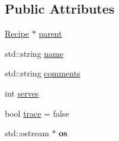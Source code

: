 \subsection*{Public Attributes}
\begin{DoxyCompactItemize}
\item 
\hyperlink{classRecipe}{Recipe} $\ast$ \hyperlink{classRecipe_aa0ee8a8dbfef781def252e579bfbc209}{parent}
\item 
std\-::string \hyperlink{classRecipe_a50091cc91548be3bf3399bd0471667f1}{name}
\item 
std\-::string \hyperlink{classRecipe_acb84c5456c600ac904b49ff56b13ed5e}{comments}
\item 
int \hyperlink{classRecipe_a265d7fcca7983c4900e76eb10959c9c2}{serves}
\item 
bool \hyperlink{classRecipe_a88d8c79248361e1c53b8ab3a1b91238c}{trace} = false
\item 
\hypertarget{classRecipe_a7bb1c6b99c67bd80e6df48009af2573e}{std\-::ostream $\ast$ {\bfseries os}}\label{classRecipe_a7bb1c6b99c67bd80e6df48009af2573e}

\end{DoxyCompactItemize}
